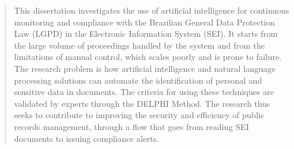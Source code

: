
\begin{abstract}
This dissertation investigates the use of artificial intelligence for
continuous monitoring and compliance with the Brazilian General Data Protection
Law (LGPD) in the Electronic Information System (SEI). It starts from the large
volume of proceedings handled by the system and from the limitations of manual
control, which scales poorly and is prone to failure. The research problem is
how artificial intelligence and natural language processing solutions can
automate the identification of personal and sensitive data in documents. The
criteria for using these techniques are validated by experts through the DELPHI
Method. The research thus seeks to contribute to improving the security and efficiency of
public records management, through a flow that goes from reading SEI documents
to issuing compliance alerts.
\end{abstract}
